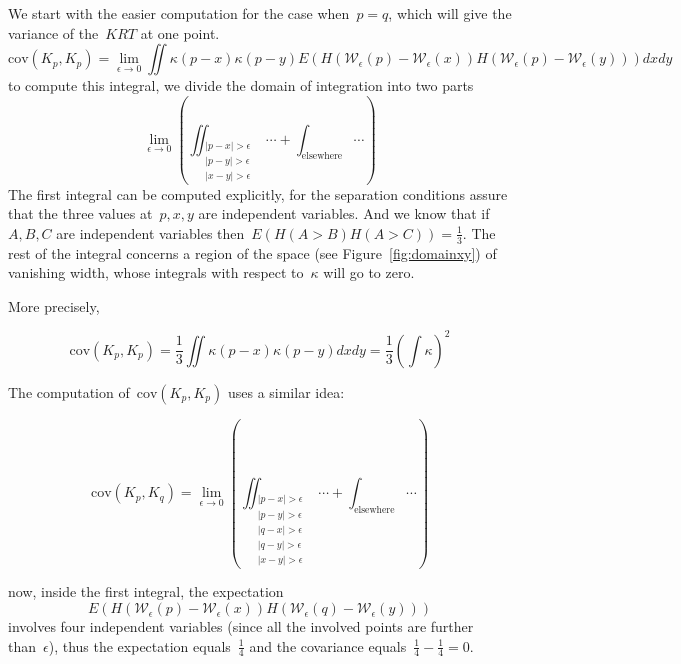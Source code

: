 \documentclass[12pt]{article}                  %
\begin{document}
We start with the easier computation for the case when~$p=q$, which will
give the variance of the~$KRT$ at one point.
\[
	\mathrm{cov}(K_p,K_p)
	=
	\lim_{\epsilon\to0}
		\iint
		\kappa(p-x)
		\kappa(p-y)
	E\left(
		H(
			\mathcal{W}_\epsilon(p)
			-
			\mathcal{W}_\epsilon(x)
		)
		H(
			\mathcal{W}_\epsilon(p)
			-
			\mathcal{W}_\epsilon(y)
		)
	\right)
		dx
		dy
\]
to compute this integral, we divide the domain of integration into two parts
\begin{equation}
	\label{eq:domainxy}
	\lim_{\epsilon\to0}
	\left(
		\iint_{\begin{smallmatrix}
			|p-x|>\epsilon\\
			|p-y|>\epsilon\\
			|x-y|>\epsilon
		\end{smallmatrix}}\cdots
	+\int_{\textrm{elsewhere}}\cdots
	\right)
\end{equation}
The first integral can be computed explicitly, for the separation conditions
assure that the three values at~$p,x,y$ are independent variables.  And we
know that if~$A,B,C$ are independent variables
then~$E(H(A>B)H(A>C))=\frac13$.  The rest of the integral concerns a region
of the space (see Figure~\ref{fig:domainxy}) of vanishing width, whose
integrals with respect to~$\kappa$ will go to zero.

More precisely,

\[
	\mathrm{cov}(K_p,K_p)
	=
	\frac13\iint\kappa(p-x)\kappa(p-y)dxdy
	=
	\frac13\left(\int\kappa\right)^2
\]


The computation of~$\mathrm{cov}(K_p,K_p)$ uses a similar idea:

\begin{equation}
	\label{eq:domainxy}
	\mathrm{cov}(K_p,K_q)
	=
	\lim_{\epsilon\to0}
	\left(
		\iint_{\begin{smallmatrix}
			|p-x|>\epsilon\\
			|p-y|>\epsilon\\
			|q-x|>\epsilon\\
			|q-y|>\epsilon\\
			|x-y|>\epsilon
		\end{smallmatrix}}\cdots
	+\int_{\textrm{elsewhere}}\cdots
	\right)
\end{equation}

now, inside the first integral, the expectation
\[
	E\left(
		H(
			\mathcal{W}_\epsilon(p)
			-
			\mathcal{W}_\epsilon(x)
		)
		H(
			\mathcal{W}_\epsilon(q)
			-
			\mathcal{W}_\epsilon(y)
		)
	\right)
\]
involves four independent variables (since all the involved points are
further than~$\epsilon$), thus the expectation equals~$\frac14$ and the
covariance equals~$\frac14-\frac14=0$.
\end{document}
